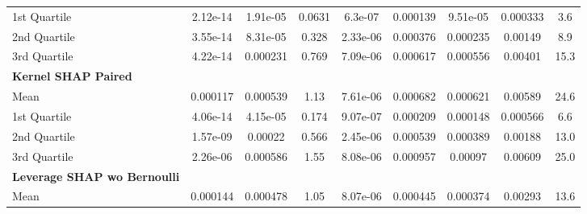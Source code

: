 {\begin{tabular} {lcccccccc}
\hspace{7pt}1st Quartile & \cellcolor{gold!60}2.12e-14 & \cellcolor{gold!60}1.91e-05 & \cellcolor{gold!60}0.0631 & \cellcolor{gold!60}6.3e-07 & \cellcolor{bronze!60}0.000139 & \cellcolor{silver!60}9.51e-05 & \cellcolor{silver!60}0.000333 & \cellcolor{silver!60}3.6 \\ 
\hspace{7pt}2nd Quartile & \cellcolor{silver!60}3.55e-14 & \cellcolor{gold!60}8.31e-05 & \cellcolor{gold!60}0.328 & \cellcolor{gold!60}2.33e-06 & \cellcolor{silver!60}0.000376 & \cellcolor{gold!60}0.000235 & \cellcolor{bronze!60}0.00149 & \cellcolor{silver!60}8.9 \\ 
\hspace{7pt}3rd Quartile & \cellcolor{silver!60}4.22e-14 & \cellcolor{gold!60}0.000231 & \cellcolor{gold!60}0.769 & \cellcolor{gold!60}7.09e-06 & \cellcolor{gold!60}0.000617 & \cellcolor{gold!60}0.000556 & \cellcolor{silver!60}0.00401 & \cellcolor{silver!60}15.3 \\ 
\addlinespace[1ex] 
\textbf{Kernel SHAP Paired} &  &  &  &  &  &  &  &  \\ 
\hspace{7pt}Mean & \cellcolor{bronze!60}0.000117 & \cellcolor{bronze!60}0.000539 & \cellcolor{bronze!60}1.13 & \cellcolor{silver!60}7.61e-06 & \cellcolor{bronze!60}0.000682 & \cellcolor{bronze!60}0.000621 & 0.00589 & 24.6 \\ 
\hspace{7pt}1st Quartile & 4.06e-14 & \cellcolor{bronze!60}4.15e-05 & \cellcolor{bronze!60}0.174 & \cellcolor{bronze!60}9.07e-07 & 0.000209 & 0.000148 & 0.000566 & 6.6 \\ 
\hspace{7pt}2nd Quartile & 1.57e-09 & \cellcolor{bronze!60}0.00022 & \cellcolor{bronze!60}0.566 & \cellcolor{silver!60}2.45e-06 & 0.000539 & 0.000389 & 0.00188 & 13.0 \\ 
\hspace{7pt}3rd Quartile & \cellcolor{bronze!60}2.26e-06 & \cellcolor{bronze!60}0.000586 & \cellcolor{bronze!60}1.55 & \cellcolor{silver!60}8.08e-06 & 0.000957 & 0.00097 & 0.00609 & \cellcolor{bronze!60}25.0 \\ 
\addlinespace[1ex] 
\textbf{Leverage SHAP wo Bernoulli} &  &  &  &  &  &  &  &  \\ 
\hspace{7pt}Mean & 0.000144 & \cellcolor{silver!60}0.000478 & \cellcolor{silver!60}1.05 & \cellcolor{bronze!60}8.07e-06 & \cellcolor{gold!60}0.000445 & \cellcolor{silver!60}0.000374 & \cellcolor{gold!60}0.00293 & \cellcolor{gold!60}13.6 \\ 

\end{tabular}}

